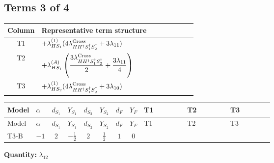 \documentclass[8pt]{article}
\begin{document}
\begin{landscape}
\subsection*{Terms 3 of 4}
\begin{center}
\begin{tabular}{@{}c >{\raggedright\arraybackslash}p{0.82\linewidth}@{}}
\toprule
Column & Representative term structure \\
\midrule
T1 & \(\displaystyle +{\lambda_{HS_1}^{(1)}} (4 {\lambda_{H H^\dagger S_1^\dagger S_2^\dagger}^{\rm Cross}}+3 {\lambda_{11}})\) \\
\midrule
T2 & \(\displaystyle +{\lambda_{HS_1}^{(A)}} \left(\frac{3 {\lambda_{H H^\dagger S_1^\dagger S_2^\dagger}^{\rm Cross}}}{2}+\frac{3 {\lambda_{11}}}{4}\right)\) \\
\midrule
T3 & \(\displaystyle +{\lambda_{HS_2}^{(1)}} (4 {\lambda_{H H^\dagger S_1^\dagger S_2^\dagger}^{\rm Cross}}+3 {\lambda_{10}})\) \\
\midrule
\bottomrule
\end{tabular}
\end{center}
\smallskip
\tiny
\begin{longtable}{@{}llcccccc >{\raggedright\arraybackslash}p{0.21\linewidth} >{\raggedright\arraybackslash}p{0.21\linewidth} >{\raggedright\arraybackslash}p{0.21\linewidth}@{}}
\toprule
Model & $\alpha$ & $d_{S_1}$ & $Y_{S_1}$ & $d_{S_2}$ & $Y_{S_2}$ & $d_F$ & $Y_F$ & T1 & T2 & T3 \\
\midrule
\endfirsthead
\toprule
Model & $\alpha$ & $d_{S_1}$ & $Y_{S_1}$ & $d_{S_2}$ & $Y_{S_2}$ & $d_F$ & $Y_F$ & T1 & T2 & T3 \\
\midrule
\endhead
T3-B & $-1$ & $2$ & $-\frac{1}{2}$ & $2$ & $\frac{1}{2}$ & $1$ & $0$ & \scriptsize\adjustbox{max width=\linewidth}{$\begin{gathered} +{\lambda_{HS_1}^{(1)}} (4 {\lambda_{H H^\dagger S_1^\dagger S_2^\dagger}^{\rm Cross}}+3 {\lambda_{11}})\end{gathered}$} & \scriptsize\adjustbox{max width=\linewidth}{$\begin{gathered} +{\lambda_{HS_1}^{(A)}} \left(\frac{3 {\lambda_{H H^\dagger S_1^\dagger S_2^\dagger}^{\rm Cross}}}{2}+\frac{3 {\lambda_{11}}}{4}\right)\end{gathered}$} & \scriptsize\adjustbox{max width=\linewidth}{$\begin{gathered} +{\lambda_{HS_2}^{(1)}} (4 {\lambda_{H H^\dagger S_1^\dagger S_2^\dagger}^{\rm Cross}}+3 {\lambda_{10}})\end{gathered}$} \\
\midrule
\bottomrule
\end{longtable}
\clearpage
\noindent\textbf{Quantity: }$\lambda_{12}$\par\smallskip

\end{landscape}
\end{document}

